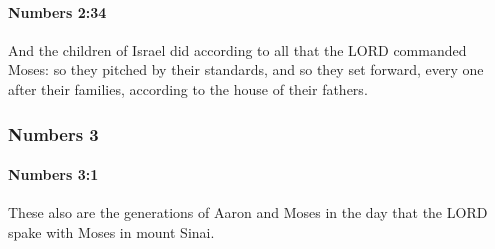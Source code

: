 		\paragraph{Numbers 2:34} %
			\label{NUMBERS-2-34}

			And the children of Israel did according to all that the LORD commanded Moses: so they pitched by their standards, and so they set forward, every one after their families, according to the house of their fathers.

	\subsubsection{Numbers 3} %
		\label{NUMBERS-3}

		\paragraph{Numbers 3:1} %
			\label{NUMBERS-3-1}

			These also are the generations of Aaron and Moses in the day that the LORD spake with Moses in mount Sinai.

